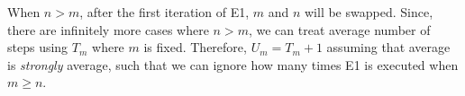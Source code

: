 When $n > m$, after the first iteration of E1, $m$ and $n$ will be swapped. 
Since, there are infinitely more cases where $n > m$, we can treat average 
number of steps using $T_{m}$ where $m$ is fixed. Therefore, $U_{m} = T_{m} + 1$ 
assuming that average is \emph{strongly} average, such that we can ignore how 
many times E1 is executed when $m \ge n$.